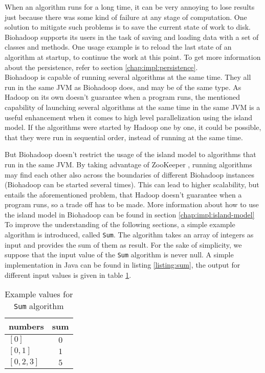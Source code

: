  When an algorithm runs for a long time, it can be very annoying to lose results just because there was some kind of failure at any stage of computation. One solution to mitigate such problems is to save the current state of work to disk. Biohadoop supports its users in the task of saving and loading data with a set of classes and methods. One usage example is to reload the last state of an algorithm at startup, to continue the work at this point. To get more information about the persistence, refer to section \ref{chap:impl:persistence}.\\
  
  Biohadoop is capable of running several algorithms at the same time. They all run in the same JVM as Biohadoop does, and may be of the same type. As Hadoop on its own doesn't guarantee when a program runs, the mentioned capability of launching several algorithms at the same time in the same JVM is a useful enhancement when it comes to high level parallelization using the island model. If the algorithms were started by Hadoop one by one, it could be possible, that they were run in sequential order, instead of running at the same time.
  
  But Biohadoop doesn't restrict the usage of the island model to algorithms that run in the same JVM. By taking advantage of ZooKeeper \cite{zookeeper}, running algorithms may find each other also across the boundaries of different Biohadoop instances (Biohadoop can be started several times). This can lead to higher scalability, but entails the aforementioned problem, that Hadoop doesn't guarantee when a program runs, so a trade off has to be made. More information about how to use the island model in Biohadoop can be found in section \ref{chap:impl:island-model}\\
  
  To improve the understanding of the following sections, a simple example algorithm is introduced, called \texttt{Sum}. The algorithm takes an array of integers as input and provides the sum of them as result. For the sake of simplicity, we suppose that the input value of the \texttt{Sum} algorithm is never null. A simple implementation in Java can be found in listing \ref{listing:sum}, the output for different input values is given in table \ref{table:sum-algorithm}.
  
  
  
  \begin{table}
    \centering
    \setlength{\tabcolsep}{15pt}
    \begin{tabular}{l|c}
      numbers & sum \\ \hline
      $[0]$ & $0$ \\
      $[0,1]$ & $1$ \\
      $[0,2,3]$ & $5$ \\
    \end{tabular}
    \caption{Example values for \texttt{Sum} algorithm}
    \label{table:sum-algorithm}
  \end{table}

